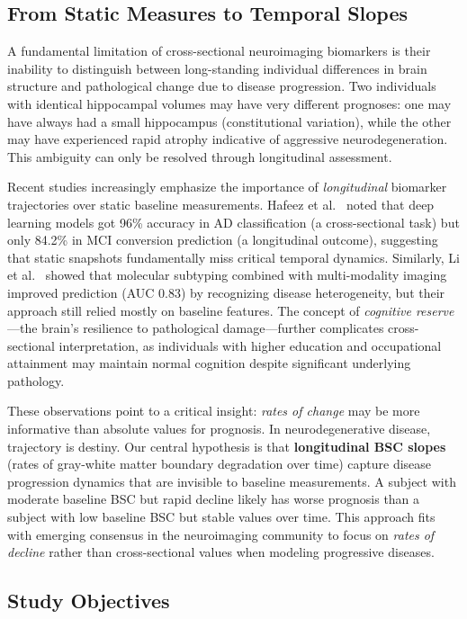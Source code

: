 \documentclass[blue]{ludusofficial}  %
\begin{document}
\subsection{From Static Measures to Temporal Slopes}

A fundamental limitation of cross-sectional neuroimaging biomarkers is their inability to distinguish between long-standing individual differences in brain structure and pathological change due to disease progression. Two individuals with identical hippocampal volumes may have very different prognoses: one may have always had a small hippocampus (constitutional variation), while the other may have experienced rapid atrophy indicative of aggressive neurodegeneration. This ambiguity can only be resolved through longitudinal assessment.

Recent studies increasingly emphasize the importance of \textit{longitudinal} biomarker trajectories over static baseline measurements. Hafeez et al.~\cite{hafeez2024deep} noted that deep learning models got 96\% accuracy in AD classification (a cross-sectional task) but only 84.2\% in MCI conversion prediction (a longitudinal outcome), suggesting that static snapshots fundamentally miss critical temporal dynamics. Similarly, Li et al.~\cite{li2021predicting} showed that molecular subtyping combined with multi-modality imaging improved prediction (AUC 0.83) by recognizing disease heterogeneity, but their approach still relied mostly on baseline features. The concept of \textit{cognitive reserve}—the brain's resilience to pathological damage—further complicates cross-sectional interpretation, as individuals with higher education and occupational attainment may maintain normal cognition despite significant underlying pathology.

These observations point to a critical insight: \textit{rates of change} may be more informative than absolute values for prognosis. In neurodegenerative disease, trajectory is destiny. Our central hypothesis is that \textbf{longitudinal BSC slopes} (rates of gray-white matter boundary degradation over time) capture disease progression dynamics that are invisible to baseline measurements. A subject with moderate baseline BSC but rapid decline likely has worse prognosis than a subject with low baseline BSC but stable values over time. This approach fits with emerging consensus in the neuroimaging community to focus on \textit{rates of decline} rather than cross-sectional values when modeling progressive diseases.

\subsection{Study Objectives}
\end{document}
